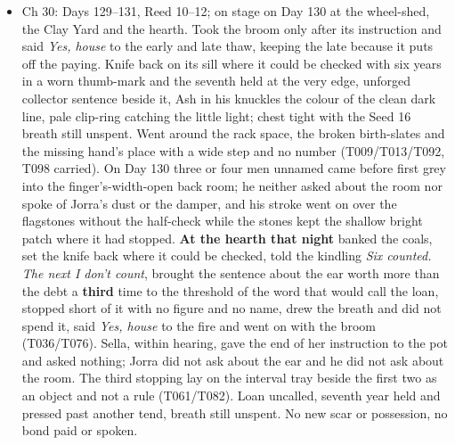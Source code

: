 \documentclass{design/chronicle}
\begin{document}
{\begin{itemize}[leftmargin=1.4em,itemsep=1pt,topsep=3pt,parsep=0pt]
\item Ch 30: Days 129–131, Reed 10–12; on stage on Day 130 at the wheel-shed, the Clay Yard and the hearth. Took the broom only after its instruction and said \emph{Yes, house} to the early and late thaw, keeping the late because it puts off the paying. Knife back on its sill where it could be checked with six years in a worn thumb-mark and the seventh held at the very edge, unforged collector sentence beside it, Ash in his knuckles the colour of the clean dark line, pale clip-ring catching the little light; chest tight with the Seed 16 breath still unspent. Went around the rack space, the broken birth-slates and the missing hand’s place with a wide step and no number (T009/T013/T092, T098 carried). On Day 130 three or four men unnamed came before first grey into the finger’s-width-open back room; he neither asked about the room nor spoke of Jorra’s dust or the damper, and his stroke went on over the flagstones without the half-check while the stones kept the shallow bright patch where it had stopped. \textbf{At the hearth that night} banked the coals, set the knife back where it could be checked, told the kindling \emph{Six counted. The next I don’t count}, brought the sentence about the ear worth more than the debt a \textbf{third} time to the threshold of the word that would call the loan, stopped short of it with no figure and no name, drew the breath and did not spend it, said \emph{Yes, house} to the fire and went on with the broom (T036/T076). Sella, within hearing, gave the end of her instruction to the pot and asked nothing; Jorra did not ask about the ear and he did not ask about the room. The third stopping lay on the interval tray beside the first two as an object and not a rule (T061/T082). Loan uncalled, seventh year held and pressed past another tend, breath still unspent. No new scar or possession, no bond paid or spoken.

\end{itemize}

\begin{itemize}[leftmargin=1.4em,itemsep=1pt,topsep=3pt,parsep=0pt]


\end{itemize}}
\end{document}
